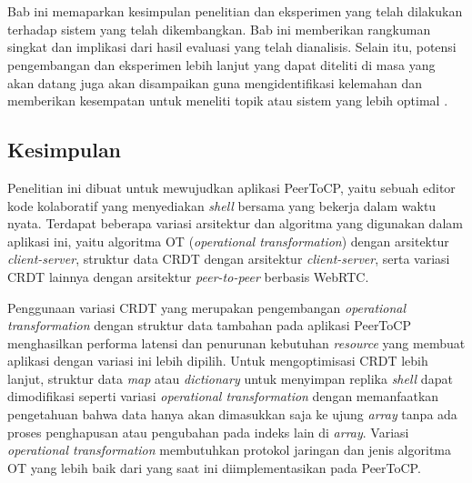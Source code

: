 \chapter{\kesimpulan}
\label{bab:6}
Bab ini memaparkan kesimpulan penelitian dan eksperimen yang telah dilakukan terhadap sistem yang telah dikembangkan. Bab ini memberikan rangkuman singkat dan implikasi dari hasil evaluasi yang telah dianalisis. Selain itu, potensi pengembangan dan eksperimen lebih lanjut yang dapat diteliti di masa yang akan datang juga akan disampaikan guna mengidentifikasi kelemahan dan memberikan kesempatan untuk meneliti topik atau sistem yang lebih optimal .

\section{Kesimpulan}
\label{sec:kesimpulan}

Penelitian ini dibuat untuk mewujudkan aplikasi PeerToCP, yaitu sebuah editor kode kolaboratif yang menyediakan \textit{shell} bersama yang bekerja dalam waktu nyata. Terdapat beberapa variasi arsitektur dan algoritma yang digunakan dalam aplikasi ini, yaitu algoritma OT (\textit{operational transformation}) dengan arsitektur \textit{client-server}, struktur data CRDT dengan arsitektur \textit{client-server}, serta variasi CRDT lainnya dengan arsitektur \textit{peer-to-peer} berbasis WebRTC.

Penggunaan variasi CRDT yang merupakan pengembangan \textit{operational transformation} dengan struktur data tambahan pada aplikasi PeerToCP menghasilkan performa latensi dan penurunan kebutuhan \textit{resource} yang membuat aplikasi dengan variasi ini lebih dipilih. Untuk mengoptimisasi CRDT lebih lanjut, struktur data \textit{map} atau \textit{dictionary} untuk menyimpan replika \textit{shell} dapat dimodifikasi seperti variasi \textit{operational transformation} dengan memanfaatkan pengetahuan bahwa data hanya akan dimasukkan saja ke ujung \textit{array} tanpa ada proses penghapusan atau pengubahan pada indeks lain di \textit{array}. Variasi \textit{operational transformation} membutuhkan protokol jaringan dan jenis algoritma OT yang lebih baik dari yang saat ini diimplementasikan pada PeerToCP.

